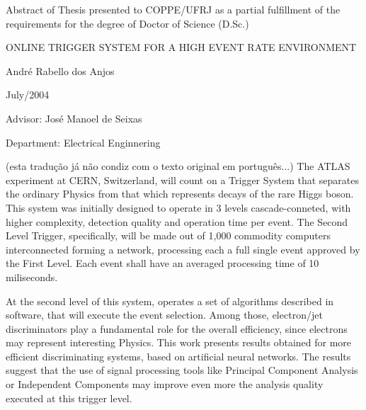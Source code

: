\clearpage

\noindent
Abstract of Thesis presented to COPPE/UFRJ as a partial fulfillment of the
\linebreak requirements for the degree of Doctor of Science (D.Sc.)

\vspace{1.5cm}

\begin{center}
ONLINE TRIGGER SYSTEM FOR A HIGH EVENT RATE ENVIRONMENT 
\vspace{1cm}

André Rabello dos Anjos
\vspace{1cm}

July/2004
\end{center}
\vspace{2cm}

\noindent
Advisor: José Manoel de Seixas
\vspace{2cm}

\noindent
Department: Electrical Enginnering
\vspace{2cm}

\begin{summary}{1.2}
(esta tradução já não condiz com o texto original em português...)
The ATLAS experiment at CERN, Switzerland, will count on a Trigger System that
separates the ordinary Physics from that which represents decays of the rare
Higgs boson. This system was initially designed to operate in 3 levels
cascade-conneted, with higher complexity, detection quality and operation time
per event. The Second Level Trigger, specifically, will be made out of 1,000
commodity computers interconnected forming a network, processing each a full
single event approved by the First Level. Each event shall have an averaged
processing time of 10 miliseconds.

At the second level of this system, operates a set of algorithms described in
software, that will execute the event selection. Among those, electron/jet
discriminators play a fundamental role for the overall efficiency, since
electrons may represent interesting Physics. This work presents results
obtained for more efficient discriminating systems, based on artificial neural
networks. The results suggest that the use of signal processing tools like
Principal Component Analysis or Independent Components may improve even more
the analysis quality executed at this trigger level.
\end{summary}
